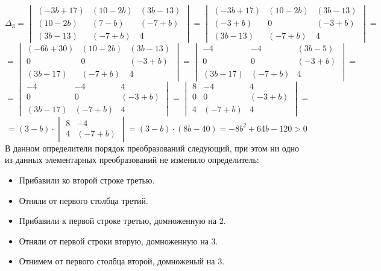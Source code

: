 	
	\[ \Delta_3 =
		\begin{vmatrix}
		(-3b + 17) & (10 - 2b) & (3b - 13) \\
		(10 - 2b) & (7 - b) & (-7 + b) \\
		(3b - 13) & (-7 + b) & 4
		\end{vmatrix} = 
		\begin{vmatrix}
		(-3b + 17) & (10 - 2b) & (3b - 13) \\
		(-3 + b) & 0 & (-3 + b) \\
		(3b - 13) & (-7 + b) & 4
		\end{vmatrix} = 
	\]
	\[
		= \begin{vmatrix}
		(-6b + 30) & (10 - 2b) & (3b - 13) \\
		0 & 0 & (-3 + b) \\
		(3b - 17) & (-7 + b) & 4
		\end{vmatrix} = 
		\begin{vmatrix}
		-4 & -4 & (3b - 5) \\
		0 & 0 & (-3 + b) \\
		(3b - 17) & (-7 + b) & 4
		\end{vmatrix} = 
	\]
	\[
		= \begin{vmatrix}
		-4 & -4 & 4 \\
		0 & 0 & (-3 + b) \\
		(3b - 17) & (-7 + b) & 4
		\end{vmatrix} = 
		\begin{vmatrix}
		8 & -4 & 4 \\
		0 & 0 & (-3 + b) \\
		4 & (-7 + b) & 4
		\end{vmatrix} = 
	\]
	\[ = (3 - b) \cdot
		\begin{vmatrix}
		8 & -4 \\
		4 & (-7 + b)
		\end{vmatrix} = (3 - b) \cdot (8b - 40) = -8b^2 + 64b - 120 > 0
	\]
	В данном определители порядок преобразований следующий, при этом ни одно из данных элементарных преобразований не изменило определитель:
	\begin{itemize}
		\item Прибавили ко второй строке третью.
		\item Отняли от первого столбца третий.
		\item Прибавили к первой строке третью, домноженную на 2.
		\item Отняли от первой строки вторую, домноженную на 3.
		\item Отнимем от первого столбца второй, домноженый на 3.
	\end{itemize}
	
